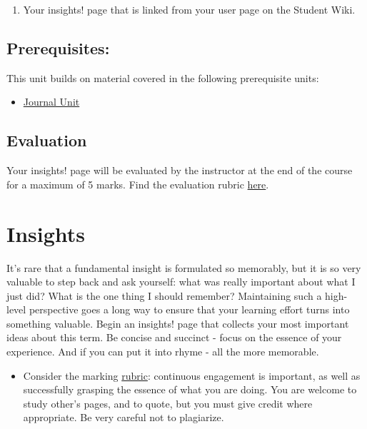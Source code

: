 \documentclass[]{book}
\providecommand{\tightlist}{%
  \setlength{\itemsep}{0pt}\setlength{\parskip}{0pt}}
\begin{document}
\begin{enumerate}
\def\labelenumi{\arabic{enumi}.}
\tightlist
\item
  Your insights! page that is linked from your user page on the Student
  Wiki.
\end{enumerate}

\subsection{Prerequisites:}\label{prerequisites-1}

This unit builds on material covered in the following prerequisite
units:

\begin{itemize}
\tightlist
\item
  \protect\hyperlink{journal}{Journal Unit}
\end{itemize}

\subsection{Evaluation}\label{evaluation}

Your insights! page will be evaluated by the instructor at the end of
the course for a maximum of 5 marks. Find the evaluation rubric
\href{http://steipe.biochemistry.utoronto.ca/abc/index.php/ABC-Rubrics\#Insights}{here}.

\section{Insights}\label{insights}

It's rare that a fundamental insight is formulated so memorably, but it
is so very valuable to step back and ask yourself: what was really
important about what I just did? What is the one thing I should
remember? Maintaining such a high-level perspective goes a long way to
ensure that your learning effort turns into something valuable. Begin an
insights! page that collects your most important ideas about this term.
Be concise and succinct - focus on the essence of your experience. And
if you can put it into rhyme - all the more memorable.

\begin{itemize}
\tightlist
\item
  Consider the marking
  \href{http://steipe.biochemistry.utoronto.ca/abc/index.php/ABC-Rubrics\#insights.21}{rubric}:
  continuous engagement is important, as well as successfully grasping
  the essence of what you are doing. You are welcome to study other's
  pages, and to quote, but you must give credit where appropriate. Be
  very careful not to plagiarize.
\end{itemize}
\end{document}
